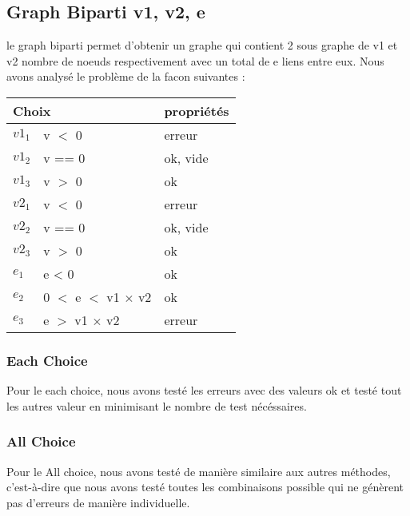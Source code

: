 \documentclass[11pt]{article}
\begin{document}
\subsection{Graph Biparti v1, v2, e}
le graph biparti permet d'obtenir un graphe qui contient 2 sous graphe de v1 et v2 nombre de noeuds respectivement avec un total de e liens entre eux.
Nous avons analysé le problème de la facon suivantes :
\begin{tabular}{|l|l|l|}
 \hline
 \multicolumn{2}{|l|}{Choix} & propriétés                            \\ \hline
 ${v1}_1$                    & v $<$ 0                    & erreur   \\ \hline
 ${v1}_2$                    & v == 0                     & ok, vide \\ \hline
 ${v1}_3$                    & v $>$ 0                    & ok       \\ \hline \hline
 ${v2}_1$                    & v $<$ 0                    & erreur   \\ \hline
 ${v2}_2$                    & v == 0                     & ok, vide \\ \hline
 ${v2}_3$                    & v $>$ 0                    & ok       \\ \hline \hline
 $e_1$                       & e < 0                      & ok       \\ \hline
 $e_2$                       & 0 $<$ e $<$ v1 $\times$ v2 & ok       \\ \hline
 $e_3$                       & e $>$ v1 $\times$ v2       & erreur   \\ \hline
\end{tabular}
\subsubsection{Each Choice}
Pour le each choice, nous avons testé les erreurs avec des valeurs ok et testé tout les autres valeur en minimisant le nombre de test nécéssaires.
\subsubsection{All Choice}
Pour le All choice, nous avons testé de manière similaire aux autres méthodes, c'est-à-dire que nous avons testé toutes les combinaisons possible qui ne génèrent pas d'erreurs de manière individuelle.
\end{document}
